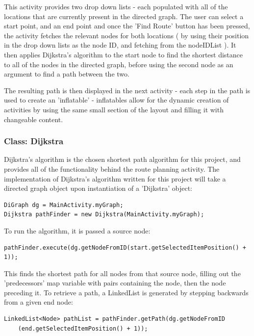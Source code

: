 \documentclass[11pt]{informatics-report}
\begin{document}
This activity provides two drop down lists - each populated with all of the locations that are currently present in the directed graph. The user can select a start point, and an end point and once the 'Find Route' button has been pressed, the activity fetches the relevant nodes for both locations ( by using their position in the drop down lists as the node ID, and fetching from the nodeIDList ). It then applies Dijkstra's algorithm to the start node to find the shortest distance to all of the nodes in the directed graph, before using the second node as an argument to find a path between the two.

The resulting path is then displayed in the next activity - each step in the path is used to create an 'inflatable' - inflatables allow for the dynamic creation of activities by using the same small section of the layout and filling it with changeable content.

\subsubsection{Class: Dijkstra}

Dijkstra's algorithm is the chosen shortest path algorithm for this project, and provides all of the functionality behind the route planning activity. The implementation of Dijkstra's algorithm written for this project will take a directed graph object upon instantiation of a 'Dijkstra' object:

\begin{verbatim}
DiGraph dg = MainActivity.myGraph;
Dijkstra pathFinder = new Dijkstra(MainActivity.myGraph);
\end{verbatim}

To run the algorithm, it is passed a source node:

\begin{verbatim}
pathFinder.execute(dg.getNodeFromID(start.getSelectedItemPosition() + 1));
\end{verbatim}

This finds the shortest path for all nodes from that source node, filling out the 'predecessors' map variable with pairs containing the node, then the node preceding it. To retrieve a path, a LinkedList is generated by stepping backwards from a given end node:

\begin{verbatim}
LinkedList<Node> pathList = pathFinder.getPath(dg.getNodeFromID
	(end.getSelectedItemPosition() + 1));
\end{verbatim}
\end{document}

